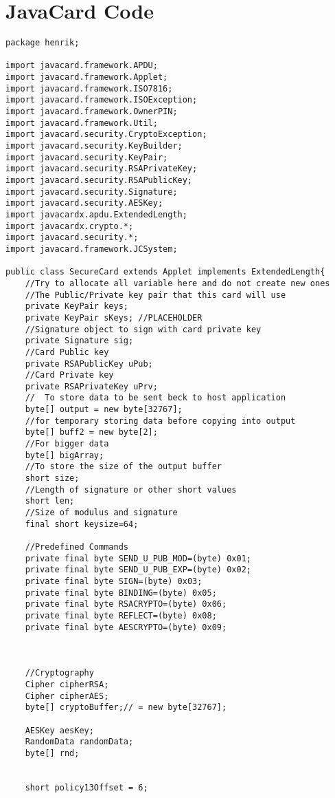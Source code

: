\chapter{JavaCard Code}
\label{app:A}
\begin{lstlisting}[caption=SecureCard.java.,breaklines=true,breakatwhitespace=false, label=lst:SecureCard,escapechar=!]
package henrik;

import javacard.framework.APDU;
import javacard.framework.Applet;
import javacard.framework.ISO7816;
import javacard.framework.ISOException;
import javacard.framework.OwnerPIN;
import javacard.framework.Util;
import javacard.security.CryptoException;
import javacard.security.KeyBuilder;
import javacard.security.KeyPair;
import javacard.security.RSAPrivateKey;
import javacard.security.RSAPublicKey;
import javacard.security.Signature;
import javacard.security.AESKey;
import javacardx.apdu.ExtendedLength;
import javacardx.crypto.*;
import javacard.security.*;
import javacard.framework.JCSystem;

public class SecureCard extends Applet implements ExtendedLength{
	//Try to allocate all variable here and do not create new ones
	//The Public/Private key pair that this card will use
	private KeyPair keys;
	private KeyPair sKeys; //PLACEHOLDER
	//Signature object to sign with card private key
	private Signature sig;
	//Card Public key
	private RSAPublicKey uPub;
    //Card Private key
	private RSAPrivateKey uPrv;
    //	To store data to be sent beck to host application
	byte[] output = new byte[32767];
	//for temporary storing data before copying into output
	byte[] buff2 = new byte[2];
	//For bigger data
	byte[] bigArray;
	//To store the size of the output buffer
	short size;
	//Length of signature or other short values
	short len;
	//Size of modulus and signature
	final short keysize=64;

	//Predefined Commands
	private final byte SEND_U_PUB_MOD=(byte) 0x01;
	private final byte SEND_U_PUB_EXP=(byte) 0x02;
	private final byte SIGN=(byte) 0x03;
	private final byte BINDING=(byte) 0x05;
	private final byte RSACRYPTO=(byte) 0x06;
	private final byte REFLECT=(byte) 0x08;
	private final byte AESCRYPTO=(byte) 0x09;



	//Cryptography
	Cipher cipherRSA;
	Cipher cipherAES;
	byte[] cryptoBuffer;// = new byte[32767];

	AESKey aesKey;
	RandomData randomData;
	byte[] rnd;


	short policy13Offset = 6;



\end{lstlisting}
